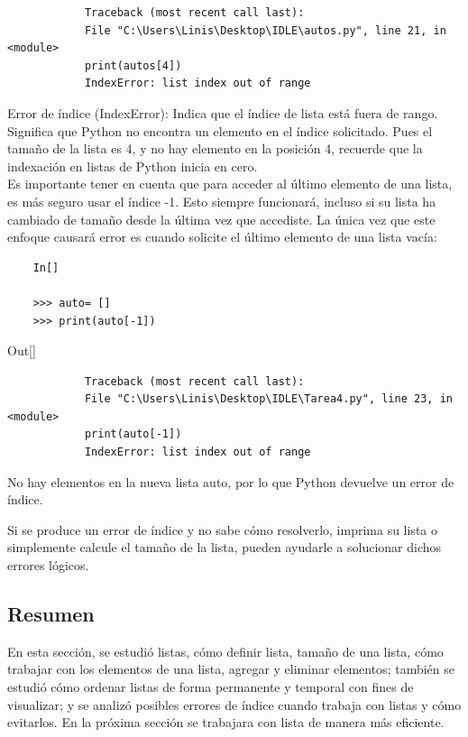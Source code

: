 {\ttfamily\scriptsize\scriptsize 
	\hspace{-0.65cm}  \vspace{-0.3cm}	
	{\color{blue} 	
		\begin{verbatim}
			Traceback (most recent call last):
			File "C:\Users\Linis\Desktop\IDLE\autos.py", line 21, in <module>
			print(autos[4])
			IndexError: list index out of range
		\end{verbatim}
}}
\noindent Error de índice ({\ttfamily IndexError}): Indica que el índice de lista está fuera de rango. 
Significa que Python no  encontra un elemento en el índice solicitado. Pues el tamaño de la lista es 4, y no hay elemento en la posición 4, recuerde que la indexación en listas de Python inicia en cero.\\

Es importante tener en cuenta que para acceder al último elemento de una lista, es más seguro usar el índice -1. Esto siempre funcionará, incluso si su lista ha cambiado de tamaño desde la última vez que accediste.
La única vez que este enfoque causará  error es cuando solicite el último elemento de una lista vacía:
\begin{lstlisting}
	In[]
	
	>>> auto= []
	>>> print(auto[-1])
\end{lstlisting}

{\ttfamily\scriptsize\scriptsize 
	\hspace{-0.65cm}Out[]\vspace{-0.3cm}	
	{\color{blue} 	
		\begin{verbatim}
			Traceback (most recent call last):
			File "C:\Users\Linis\Desktop\IDLE\Tarea4.py", line 23, in <module>
			print(auto[-1])
			IndexError: list index out of range
		\end{verbatim}
}}
\noindent No hay elementos en la nueva lista auto, por lo que Python devuelve un error de índice.

Si se produce un error de índice y no sabe cómo resolverlo, imprima su lista o simplemente calcule el tamaño
de la lista,  pueden ayudarle a solucionar dichos errores lógicos.



\subsection{Resumen}

En esta sección, se estudió  listas,  cómo  definir lista, tamaño  de una lista, cómo trabajar con los elementos de una lista, agregar y eliminar elementos; también  se estudió cómo ordenar listas de forma permanente y temporal con fines de visualizar;  y se analizó posibles errores de índice cuando trabaja con listas y cómo evitarlos.  En la próxima sección se  trabajara con lista de manera más eficiente. 



